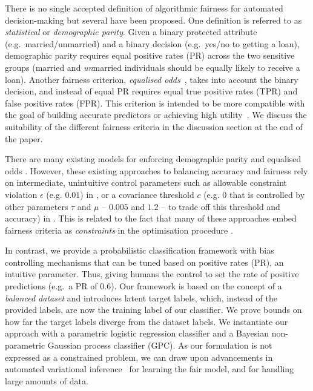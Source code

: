 There is no single accepted definition of algorithmic fairness for automated decision-making
but several have been proposed.
One definition is referred to as \emph{statistical} or \emph{demographic parity}.
Given a binary protected attribute (e.g.\ married/unmarried) and a binary decision (e.g.\ yes/no to getting a loan),
demographic parity requires equal positive rates (PR) across the two sensitive groups (married and \emph{un}married individuals should be equally likely to receive a loan).
%
Another fairness criterion, \emph{equalised odds}~\citep{hardt2016equality},
takes into account the binary decision, and instead of equal PR requires equal true positive rates (TPR) and false positive rates (FPR).
This criterion is intended to be more compatible with the goal of building accurate predictors or achieving high utility~\citep{hardt2016equality}.
We discuss the suitability of the different fairness criteria in the discussion section at the end of the paper.

There are many existing models for enforcing demographic parity and equalised odds
\citep{creager2019flexibly,AgaBeyDudLanetal18,calders2009building,kamishima2012fairness,zafar2017fairnesstreatment,zafar2017fairnessconstraints}.
However, these existing approaches to balancing accuracy and fairness rely on intermediate, unintuitive control parameters such as allowable constraint violation $\epsilon$ (e.g. $0.01$) in \citet{AgaBeyDudLanetal18}, or a covariance threshold $c$
(e.g. $0$ that is controlled by other parameters $\tau$ and $\mu$ -- $0.005$ and $1.2$ -- to trade off this threshold and accuracy)
in \citet{zafar2017fairnesstreatment}.
This is related to the fact that many of these approaches embed fairness criteria as \emph{constraints} in the optimisation procedure
\citep{DonOneBenShaetal18,quadrianto2017recycling,zafar2017fairnesstreatment,zafar2017fairnessconstraints}.

In contrast, we provide a probabilistic classification framework with bias controlling mechanisms that can be tuned based on positive rates (PR),
an intuitive parameter.
Thus, giving humans the control to set the rate of positive predictions (e.g.\ a PR of $0.6$).
Our framework is based on the concept of a \emph{balanced dataset}
and introduces latent target labels, which, instead of the provided labels, are now the training label of our classifier.
We prove bounds on how far the target labels diverge from the dataset labels.
We instantiate our approach with a parametric logistic regression classifier and a Bayesian non-parametric Gaussian process classifier (GPC).
%
As our formulation is not expressed as a constrained problem,
we can draw upon advancements in automated variational inference~\citep{bonilla2016generic,gardner2018gpytorch,krauth2016autogp}
for learning the fair model, and for handling large amounts of data.

